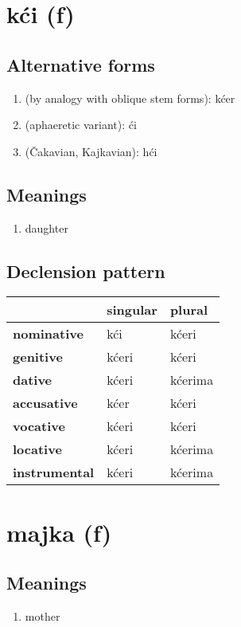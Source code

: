 \filbreak
\section{kći (f)}
\subsection*{Alternative forms}
\begin{enumerate}
\item (by analogy with oblique stem forms): kćer
\item (aphaeretic variant): ći
\item (Čakavian, Kajkavian): hći
\end{enumerate}
\subsection*{Meanings}
\begin{enumerate}
\item daughter
\end{enumerate}
\subsection*{Declension pattern}
\begin{tabularx}{\linewidth}{Xll}
\toprule
{} & singular &   plural \\
\midrule
\textbf{nominative  } &      kći &    kćeri \\
\textbf{genitive    } &    kćeri &    kćeri \\
\textbf{dative      } &    kćeri &  kćerima \\
\textbf{accusative  } &     kćer &    kćeri \\
\textbf{vocative    } &    kćeri &    kćeri \\
\textbf{locative    } &    kćeri &  kćerima \\
\textbf{instrumental} &    kćeri &  kćerima \\
\bottomrule
\end{tabularx}

\filbreak
\section{majka (f)}
\subsection*{Meanings}
\begin{enumerate}
\item mother
\end{enumerate}
